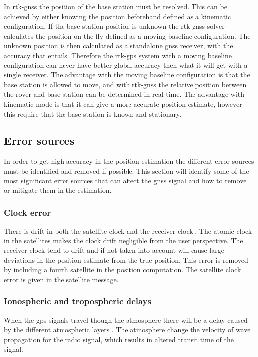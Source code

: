In \gls{rtk-gnss} the position of the base station must be resolved. This can be achieved by either knowing the position beforehand defined as a kinematic configuration. If the base station position is unknown the \gls{rtk-gnss} solver calculates the position on the fly defined as a moving baseline configuration. The unknown position is then calculated as a standalone \gls{gnss} receiver, with the accuracy that entails. Therefore the \gls{rtk-gps} system with a moving baseline configuration can never have better global accuracy then what it will get with a single receiver. The advantage with the moving baseline configuration is that the base station is allowed to move, and with \gls{rtk-gnss} the relative position between the rover and base station can be determined in real time. The advantage with kinematic mode is that it can give a more accurate position estimate, however this require that the base station is known and stationary.
\subsection{Error sources}
In order to get high accuracy in the position estimation the different error sources must be identified and removed if possible. This section will identify some of the most significant error sources that can affect the \gls{gnss} signal and how to remove or mitigate them in the estimation.
\subsubsection{Clock error}
There is drift in both the satellite clock and the receiver clock \citep{misra2011global}. The atomic clock in the satellites makes the clock drift negligible from the user perspective. The receiver clock tend to drift and if not taken into account will cause large deviations in the position estimate from the true position. This error is removed by including a fourth satellite in the position computation. The satellite clock error is given in the satellite message.
\subsubsection{Ionospheric and tropospheric delays}\label{Ss:Atmosphere}
When the \gls{gps} signals travel though the atmosphere there will be a delay caused by the different atmospheric layers \citep{misra2011global}. The atmosphere change the velocity of wave propagation for the radio signal, which results in altered transit time of the signal.
